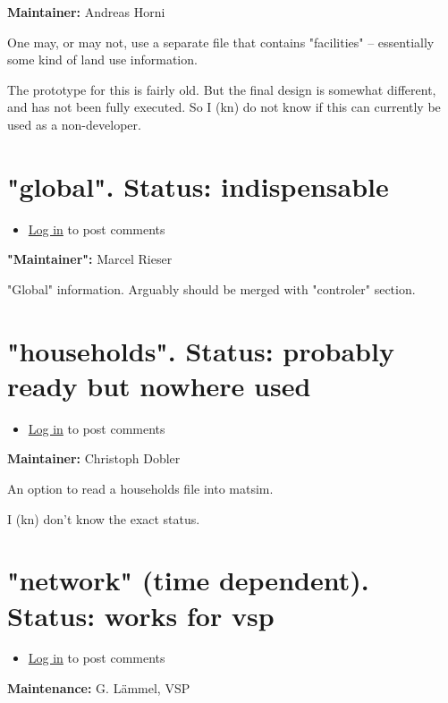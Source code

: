 \documentclass[a4paper,11pt]{report}
\begin{document}
\textbf{Maintainer:} Andreas Horni

One may, or may not, use a separate file that contains "facilities" – essentially some kind of land use information.

The prototype for this is fairly old. But the final design is  somewhat different, and has not been fully executed. So I (kn) do  not know if this can currently be used as a non-developer.

\vfill\eject
\section{"global". Status: indispensable}
\begin{itemize}
	\item \href{http://www.matsim.org/user/login?destination=comment/reply/392%23comment-form}{Log in} to post comments
\end{itemize}

\textbf{"Maintainer":} Marcel Rieser

"Global" information. Arguably should be merged with "controler" section.

\vfill\eject
\section{"households". Status: probably ready but nowhere used}
\begin{itemize}
	\item \href{http://www.matsim.org/user/login?destination=comment/reply/394%23comment-form}{Log in} to post comments
\end{itemize}

\textbf{Maintainer:} Christoph Dobler

An option to read a households file into matsim.

I (kn) don't know the exact status.

\vfill\eject
\section{"network" (time dependent). Status: works for vsp}
\begin{itemize}
	\item \href{http://www.matsim.org/user/login?destination=comment/reply/222%23comment-form}{Log in} to post comments
\end{itemize}

\textbf{Maintenance:} G. Lämmel, VSP
\end{document}
